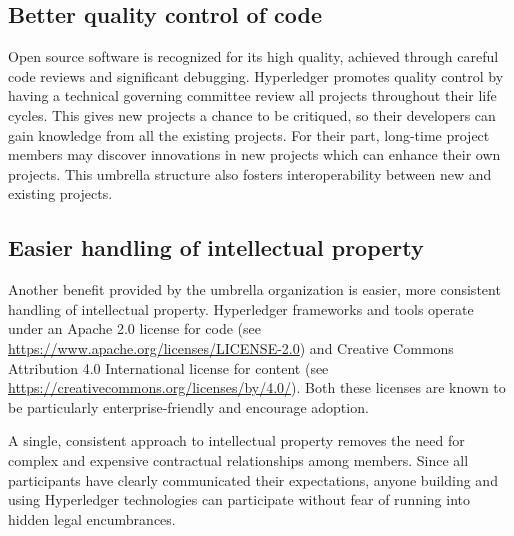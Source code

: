 \subsection{Better quality control of code}
Open source software is recognized for its high quality, achieved through careful code reviews and significant debugging. 
Hyperledger promotes quality control by having a technical governing committee review all projects throughout their life cycles.  
This gives new projects a chance to be critiqued, so their developers can gain knowledge from all the existing projects. 
For their part, long-time project members may discover innovations in new projects which can enhance their own projects. 
This umbrella structure also fosters interoperability between new and existing projects.

\subsection{Easier handling of intellectual property}
Another benefit provided by the umbrella organization is easier, more consistent handling of intellectual property. 
Hyperledger frameworks and tools operate under an Apache 2.0 license for code (see \url{https://www.apache.org/licenses/LICENSE-2.0}) and Creative Commons Attribution 4.0 International license for content (see \url{https://creativecommons.org/licenses/by/4.0/}). 
Both these licenses are known to be particularly enterprise-friendly and encourage adoption. 

A single, consistent approach to intellectual property removes the need for complex and expensive contractual relationships among members. Since all participants have clearly communicated their expectations, anyone building and using Hyperledger technologies can participate without fear of running into hidden legal encumbrances.

